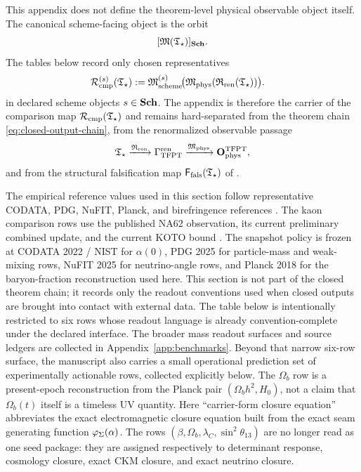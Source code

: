 This appendix does not define the theorem-level physical observable object itself. The canonical
scheme-facing object is the orbit
\[
[\mathfrak M(\mathfrak T_{\star})]_{\mathbf{Sch}}.
\]
The tables below record only chosen representatives
\[
\begin{aligned}
\mathcal R_{\mathrm{cmp}}^{(s)}(\mathfrak T_{\star})
&:=
\mathfrak M_{\mathrm{scheme}}^{(s)}\!\bigl(\mathfrak M_{\mathrm{phys}}(\mathfrak R_{\mathrm{ren}}(\mathfrak T_{\star}))\bigr).
\end{aligned}
\]
in declared scheme objects $s\in\mathbf{Sch}$. The appendix is therefore the carrier of the comparison
map $\mathcal R_{\mathrm{cmp}}(\mathfrak T_{\star})$ and remains hard-separated from the theorem chain
\eqref{eq:closed-output-chain}, from the renormalized observable passage
\[
\mathfrak T_{\star}\xrightarrow{\mathfrak R_{\mathrm{ren}}}\Gamma_{\mathrm{TFPT}}^{\mathrm{ren}}\xrightarrow{\mathfrak M_{\mathrm{phys}}}\mathbf O_{\mathrm{phys}}^{\mathrm{TFPT}},
\]
and from the structural falsification map $\mathsf F_{\mathrm{fals}}(\mathfrak T_{\star})$ of
.

The empirical reference values used in this section follow representative CODATA, PDG, NuFIT, Planck,
and birefringence references
\cite{codata2022,pdg2025,nufit2025,planck2018,minamiKomatsu2020,eskilt2023,sullivan2025}. The
kaon comparison rows use the published NA62 observation, its current preliminary combined update,
and the current KOTO bound \cite{na62obs2025,na62Moriond2026,koto2024}. The
snapshot policy is frozen at CODATA 2022 / NIST for $\alpha(0)$, PDG 2025 for particle-mass and
weak-mixing rows, NuFIT 2025 for neutrino-angle rows, and Planck 2018 for the baryon-fraction
reconstruction used here. This section is not part of the closed theorem chain; it records only
the readout conventions used when closed outputs are brought into contact with external data.
The table below is intentionally restricted to six rows whose readout language is already
convention-complete under the declared interface. The broader mass readout surfaces and source
ledgers are collected in Appendix~\ref{app:benchmarks}. Beyond that narrow six-row surface, the
manuscript also carries a
small operational prediction set of experimentally actionable rows, collected explicitly below.
The $\Omega_b$ row is a present-epoch reconstruction from the Planck pair $(\Omega_b h^2,H_0)$,
not a claim that $\Omega_b(t)$ itself is a timeless UV quantity. Here \enquote{carrier-form
closure equation} abbreviates the exact electromagnetic closure equation built from the exact seam generating
function $\varphi_{\Sigma}(\alpha)$. The rows $(\beta,\Omega_b,\lambda_C,\sin^2\theta_{13})$ are no longer
read as one seed package: they are assigned respectively to determinant response, cosmology
closure, exact CKM closure, and exact neutrino closure.

